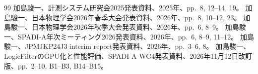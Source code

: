 \documentclass[../main.tex]{subfiles}
\begin{document}
\begin{thebibliography}{99}
  加島駿一、計測システム研究会2025発表資料、2025年、pp.\ 8, 12--14, 19。
  加島駿一、日本物理学会2026年春季大会発表資料、2026年、pp.\ 8, 10--12, 23。
  加島駿一、日本物理学会2026年秋季大会発表資料、2026年、pp.\ 6, 8--9。
  加島駿一、SPADI-A年次ミーティング2026発表資料、2026年、pp.\ 6, 8--9, 11--12。
  加島駿一、JPMJKP24J3 interim report発表資料、2026年、pp.\ 3--6, 8。
  加島駿一、LogicFilterのGPU化と性能評価、SPADI-A WG4発表資料、2026年11月12日改訂版、pp.\ 2--10, B1--B3, B14--B15。
\end{thebibliography}
\end{document}
